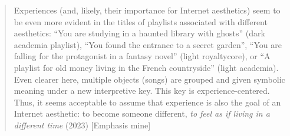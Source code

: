 \documentclass[
  letterpaper,
  DIV=11,
  numbers=noendperiod,
  oneside]{scrartcl}
\begin{document}
\begin{quote}
Experiences (and, likely, their importance for Internet aesthetics) seem
to be even more evident in the titles of playlists associated with
different aesthetics: ``You are studying in a haunted library with
ghosts'' (dark academia playlist), ``You found the entrance to a secret
garden'', ``You are falling for the protagonist in a fantasy novel''
(light royaltycore), or ``A playlist for old money living in the French
countryside'' (light academia). Even clearer here, multiple objects
(songs) are grouped and given symbolic meaning under a new interpretive
key. This key is experience-centered. Thus, it seems acceptable to
assume that experience is also the goal of an Internet aesthetic: to
become someone different, \emph{to feel as if living in a different
time} (2023) {[}Emphasis mine{]}
\end{quote}
\end{document}
